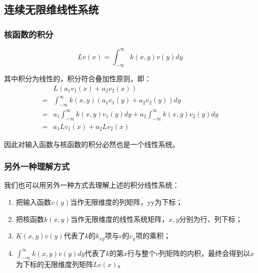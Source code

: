 \subsection{连续无限维线性系统}
\subsubsection{核函数的积分}
$$
	Lv(x) = \displaystyle{ \int_{-\infty}^{\infty}k(x,y)v(y)dy }
$$

其中积分为线性的，积分符合叠加性原则，即：
\begin{align*}
	  & L(a_1v_1(x)+a_2v_2(x))                                                             \\
	= & \int_{-\infty}^{\infty}k(x,y)\left(a_1v_1(y)+a_2v_2(y)\right)dy                    \\
	= & a_1 \int_{-\infty}^{\infty}k(x,y)v_1(y)dy+a_2\int_{-\infty}^{\infty}k(x,y)v_2(y)dy \\
	= & a_1Lv_1(x)+a_2Lv_2(x)
\end{align*}

因此对输入函数与核函数的积分必然也是一个线性系统。
\subsubsection{另外一种理解方式}
我们也可以用另外一种方式去理解上述的积分线性系统：
\begin{enumerate}
	\item 把输入函数$v(y)$当作无限维度的列矩阵，yy为下标；
	\item 把核函数$k(x,y)$当作无限维度的线性系统矩阵，$x,y$分别为行、列下标；
	\item $K(x,y)v(y)$代表了$k$的$k_{xy}$项与$v$的$v_y$项的乘积；
	\item $\int_{-\infty}^{\infty}k(x,y)v(y)dy$代表了$k$的第$x$行与整个$v$列矩阵的内积，最终会得到以$x$为下标的无限维度列矩阵$Lv(x)$。
\end{enumerate}
